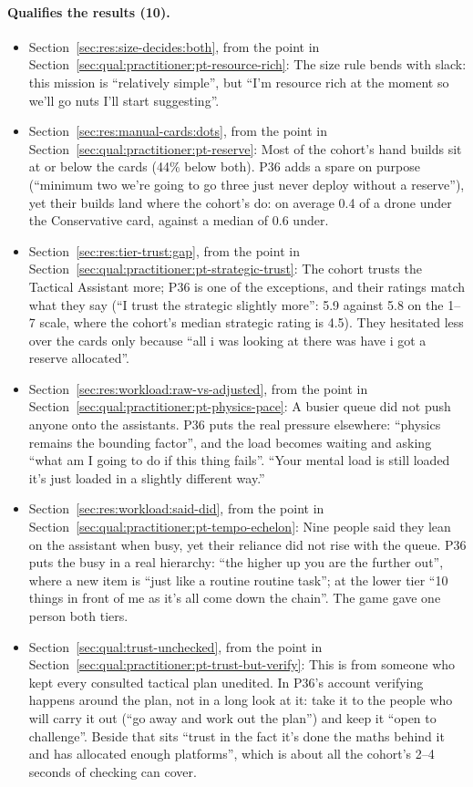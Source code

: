 \paragraph*{Qualifies the results (10).}
\begin{itemize}[leftmargin=1.2em,itemsep=1pt]\small
\item Section~\ref{sec:res:size-decides:both}, from the point in Section~\ref{sec:qual:practitioner:pt-resource-rich}: The size rule bends with slack: this mission is ``relatively simple'', but ``I'm resource rich at the moment so we'll go nuts I'll start suggesting''.
\item Section~\ref{sec:res:manual-cards:dots}, from the point in Section~\ref{sec:qual:practitioner:pt-reserve}: Most of the cohort's hand builds sit at or below the cards (44\% below both). P36 adds a spare on purpose (``minimum two we're going to go three just never deploy without a reserve''), yet their builds land where the cohort's do: on average 0.4 of a drone under the Conservative card, against a median of 0.6 under.
\item Section~\ref{sec:res:tier-trust:gap}, from the point in Section~\ref{sec:qual:practitioner:pt-strategic-trust}: The cohort trusts the Tactical Assistant more; P36 is one of the exceptions, and their ratings match what they say (``I trust the strategic slightly more'': 5.9 against 5.8 on the 1--7 scale, where the cohort's median strategic rating is 4.5). They hesitated less over the cards only because ``all i was looking at there was have i got a reserve allocated''.
\item Section~\ref{sec:res:workload:raw-vs-adjusted}, from the point in Section~\ref{sec:qual:practitioner:pt-physics-pace}: A busier queue did not push anyone onto the assistants. P36 puts the real pressure elsewhere: ``physics remains the bounding factor'', and the load becomes waiting and asking ``what am I going to do if this thing fails''. ``Your mental load is still loaded it's just loaded in a slightly different way.''
\item Section~\ref{sec:res:workload:said-did}, from the point in Section~\ref{sec:qual:practitioner:pt-tempo-echelon}: Nine people said they lean on the assistant when busy, yet their reliance did not rise with the queue. P36 puts the busy in a real hierarchy: ``the higher up you are the further out'', where a new item is ``just like a routine routine task''; at the lower tier ``10 things in front of me as it's all come down the chain''. The game gave one person both tiers.
\item Section~\ref{sec:qual:trust-unchecked}, from the point in Section~\ref{sec:qual:practitioner:pt-trust-but-verify}: This is from someone who kept every consulted tactical plan unedited. In P36's account verifying happens around the plan, not in a long look at it: take it to the people who will carry it out (``go away and work out the plan'') and keep it ``open to challenge''. Beside that sits ``trust in the fact it's done the maths behind it and has allocated enough platforms'', which is about all the cohort's 2--4 seconds of checking can cover.

\end{itemize}
